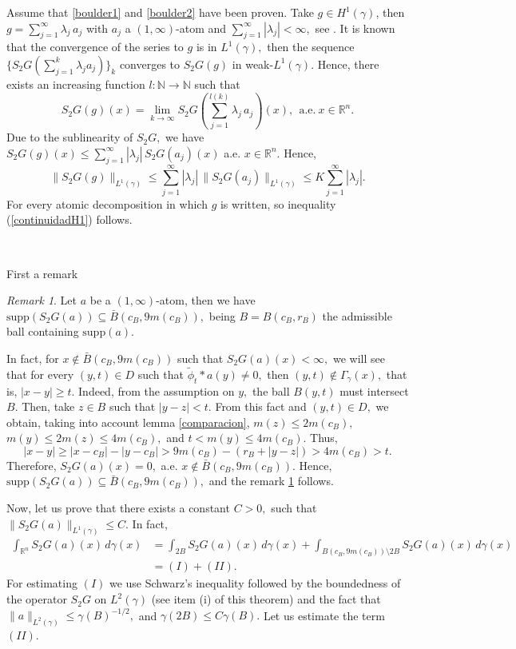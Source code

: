 \documentclass[leqno,11pt]{amsart}
\theoremstyle{plain}
\theoremstyle{remark}
\newtheorem{remark}{Remark}
\begin{document}
{{Assume that \ref{boulder1} and \ref{boulder2} have been proven. Take
$g\in H^1(\gamma)$, then $g=\sum_{j=1}^\infty\lambda_j\, a_j$ with $a_j$ a $(1,\infty)$-atom and $\sum_{j=1}^\infty|\lambda_j|<\infty,$ see \cite{MMS}. It is known that the convergence of the series to $g$ is in $L^1(\gamma),$ then the sequence $\{S_2G (\sum_{j=1}^k \lambda_j a_j)\}_k$ converges to $S_2G(g)$ in weak-$L^1(\gamma).$ Hence, there exists an increasing function $l:{\mathbb N}\to {\mathbb N}$ such that $$S_2G(g)(x)=\lim_{k\to \infty} S_2G\left(\sum_{j=1}^{l(k)}\lambda_j \, a_j\right)(x), \ \ \text{a.e.}\ x\in \mathbb{R}^n.$$ 
Due to the sublinearity of $S_2G,$ we have $S_2G(g)(x)\le \sum_{j=1}^\infty |\lambda_j|\, S_2G(a_j)(x)$ a.e. $x\in \mathbb{R}^n.$ Hence, $$\|S_2G(g)\|_{L^1(\gamma)}\le \sum_{j=1}^\infty |\lambda_j|\, \|S_2G(a_j)\|_{L^1(\gamma)}\le K \sum_{j=1}^\infty |\lambda_j| .$$ 
For every atomic decomposition in which $g$ is written, so inequality (\ref{continuidadH1}) follows.
 

\


First a remark
\begin{remark}\label{soporteatomico}
Let $a$ be a $(1,\infty)$-atom, then we have $\text{supp} (S_2G(a))\subseteq \bar{B}(c_B, 9 m(c_B)),$ being $B=B(c_B,r_B)$ the admissible ball containing $\text{supp}(a).$
\end{remark}
In fact, for $x\notin \bar{B}(c_B, 9 m(c_B))$ such that $S_2G(a)(x)<\infty,$ we will see that for every $(y,t)\in D$ such that $\widetilde{\phi}_t\ast a (y)\ne 0,$ 
then $(y,t)\notin \Gamma_\gamma (x),$ that is, $|x-y|\ge t.$ Indeed, from the assumption on $y,$ the ball $B(y,t)$ must intersect $B.$ Then, take $z\in B$ such that $|y-z|<t.$ From this fact and $(y,t)\in D,$ we obtain, taking into account lemma \ref{comparacion}, $m(z)\le 2 m(c_B),$ $m(y)\le 2 m(z)\le 4 m(c_B),$ and $t<m(y)\le 4 m(c_B).$ Thus,
$$|x-y|\ge |x-c_B|-|y-c_B|> 9 m(c_B)-(r_B+|y-z|)>4 m (c_B)> t.$$ Therefore, $S_2 G(a)(x)=0,$ a.e. $x\notin \bar{B}(c_B, 9 m(c_B)).$  Hence, $\text{supp}(S_2G(a))\subseteq \bar{B}(c_B,9 m(c_B)),$ and the remark \ref{soporteatomico} follows.   

Now, let us prove that there exists a constant $C>0,$ such that $\|S_2 G(a)\|_{L^1(\gamma)}\le C.$ In fact,
\begin{align*}\int_{\mathbb{R}^n}S_2G(a)(x)\, d\gamma(x)&=\int_{2B} S_2G(a)(x)\, d\gamma(x)+ \int_{B(c_B, 9 m(c_B))\setminus 2B} S_2G(a)(x)\, d\gamma(x)\\
&=(I)+(II).\end{align*}
For estimating $(I)$ we use Schwarz's inequality followed by the boundedness of the operator $S_2G$ on $L^{2}(\gamma)$ (see item (i) of this theorem) and the fact that $\|a\|_{L^2(\gamma)}\le \gamma(B)^{-1/2},$ and $\gamma(2B)\le C \gamma(B).$ Let us estimate the term $(II).$  

}}
\end{document}
